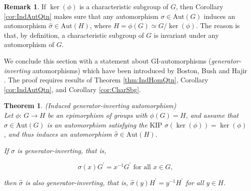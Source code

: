 \documentclass{amsart}
\newtheorem{theorem}{Theorem}[section]
\theoremstyle{definition}
\newtheorem{remark}{Remark}[section]
\numberwithin{equation}{section}
\begin{document}
\begin{remark}
\label{rmk:IndAutQtn}
If \(\ker(\phi)\) is a characteristic subgroup of \(G\),
then Corollary
\ref{cor:IndAutQtn}
makes sure that any automorphism \(\sigma\in\mathrm{Aut}(G)\)
induces an automorphism \(\hat{\sigma}\in\mathrm{Aut}(H)\),
where \(H=\phi(G)\simeq G/\ker(\phi)\).
The reason is that, by definition,
a characteristic subgroup of \(G\) is invariant under any automorphism of \(G\).
\end{remark}



We conclude this section with a statement about GI-automorphisms
(\textit{generator-inverting} automorphisms)
which have been introduced by Boston, Bush and Hajir
\cite[Dfn.2.1]{BBH}.
The proof requires results of Theorem
\ref{thm:IndHomQtn},
Corollary
\ref{cor:IndAutQtn},
and Corollary
\ref{cor:CharSbg}.


\begin{theorem}
\label{thm:GIAut}
(Induced generator-inverting automorphism)\\
Let \(\phi:\,G\to H\) be an epimorphism of groups with \(\phi(G)=H\),
and assume that \(\sigma\in\mathrm{Aut}(G)\) is an automorphism
satisfying the \(\mathrm{KIP}\) \(\sigma(\ker(\phi))=\ker(\phi)\),
and thus induces an automorphism \(\hat{\sigma}\in\mathrm{Aut}(H)\).

If \(\sigma\) is generator-inverting,
that is,

\begin{equation}
\label{eqn:GI}
\sigma(x)G^\prime=x^{-1}G^\prime \text{ for all } x\in G,
\end{equation}

then \(\hat{\sigma}\) is also generator-inverting,
that is, \(\hat{\sigma}(y)H^\prime=y^{-1}H^\prime\) for all \(y\in H\).
\end{theorem}
\end{document}
